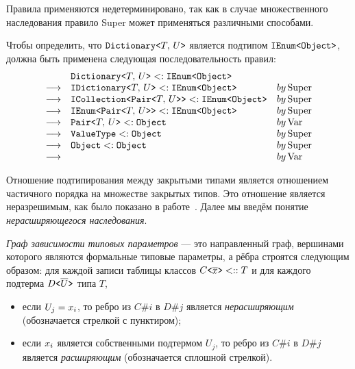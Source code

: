Правила применяются недетерминировано, так как в случае множественного наследования правило \textrm{Super} может применяться различными способами.

\begin{exmp}{\label{exmp:subtyping}}
Чтобы определить, что $\texttt{Dictionary}\texttt{<}T,\, U\texttt{>}$ является подтипом \newline $\texttt{IEnum}\texttt{<}\texttt{Object}\texttt{>}$, должна быть применена следующая последовательность правил:
\[
\begin{array}{cll}
    &\texttt{Dictionary}\texttt{<}T,\, U\texttt{>} <:  \texttt{IEnum}\texttt{<}\texttt{Object}\texttt{>} \\
    \longrightarrow & \texttt{IDictionary}\texttt{<}T,\, U\texttt{>} <:  \texttt{IEnum}\texttt{<}\texttt{Object}\texttt{>} & by \, \textrm{Super} \\
    \longrightarrow & \texttt{ICollection}\texttt{<}\texttt{Pair}\texttt{<}T,\, U\texttt{>}\texttt{>} <:  \texttt{IEnum}\texttt{<}\texttt{Object}\texttt{>} & by \, \textrm{Super} \\ 
    \longrightarrow & \texttt{IEnum}\texttt{<}\texttt{Pair}\texttt{<}T,\, U\texttt{>}\texttt{>} <:  \texttt{IEnum}\texttt{<}\texttt{Object}\texttt{>} & by \, \textrm{Super} \\ 
    \longrightarrow & \texttt{Pair}\texttt{<}T,\, U\texttt{>} <:  \texttt{Object} & by \, \textrm{Var} \\ 
    \longrightarrow & \texttt{ValueType} <:  \texttt{Object} & by \, \textrm{Super} \\ 
    \longrightarrow & \texttt{Object} <:  \texttt{Object} & by \, \textrm{Super} \\ 
    \longrightarrow & & by \, \textrm{Var} \\ 
\end{array}
\]
\end{exmp}

Отношение подтипирования между закрытыми типами является отношением частичного порядка на множестве закрытых типов. Это отношение является неразрешимым, как было показано в работе~\cite{kennedy2006decidability}. Далее мы введём понятие \emph{нерасширяющегося наследования}.

\begin{defn}
\emph{Граф зависимости типовых параметров} --- это направленный граф, вершинами которого являются формальные типовые параметры, а рёбра строятся следующим образом: для каждой записи таблицы классов $C\texttt{<}\overline{{x}}\texttt{>} <:: T$ и для каждого подтерма $D\texttt{<}\overline{U}\texttt{>}$ типа $T$,
\begin{itemize}
    \item если $U_j = {x}_i$, то ребро из $C\#i$ в $D\#j$ является \emph{нерасширяющим}  (обозначается стрелкой с пунктиром);
    \item если ${x}_i$ является собственными подтермом $U_j$, то ребро из $C\#i$ в $D\#j$ является \emph{расширяющим} (обозначается сплошной стрелкой).
\end{itemize}
\end{defn}

